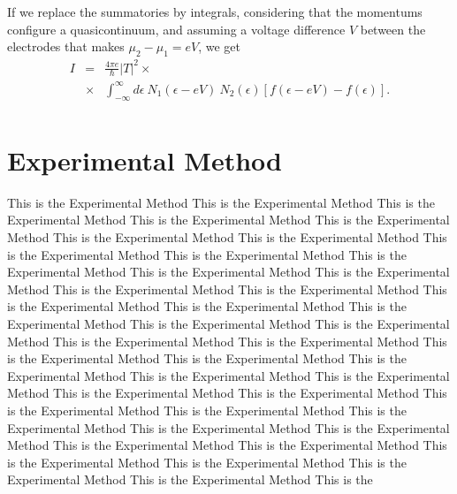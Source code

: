 \documentclass[twocolumn, twoside,a4paper,10pt]{article}
\begin{document}
If we replace the summatories by integrals, considering that the momentums configure a quasicontinuum, and assuming a voltage difference $V$ between the electrodes that makes $\mu_2-\mu_1=eV$, we get
\begin{eqnarray}\label{current3}
I &=& \frac{4\pi e}{\hbar}  |T|^2 \times
	\nonumber \\
	&\times& \int_{-\infty}^{\infty} d\epsilon\ N_1(\epsilon-eV)\ N_2(\epsilon) [f(\epsilon-eV)-f(\epsilon)].
	\nonumber \\
\end{eqnarray}




\section{Experimental Method}
This is the Experimental Method This is the Experimental Method This is the Experimental Method This is the Experimental Method This is the Experimental Method This is the Experimental Method This is the Experimental Method This is the Experimental Method This is the Experimental Method This is the Experimental Method This is the Experimental Method This is the Experimental Method This is the Experimental Method This is the Experimental Method This is the Experimental Method This is the Experimental Method This is the Experimental Method This is the Experimental Method This is the Experimental Method This is the Experimental Method This is the Experimental Method This is the Experimental Method This is the Experimental Method This is the Experimental Method This is the Experimental Method This is the Experimental Method This is the Experimental Method This is the Experimental Method This is the Experimental Method This is the Experimental Method This is the Experimental Method This is the Experimental Method This is the Experimental Method This is the Experimental Method This is the Experimental Method This is the Experimental Method This is the Experimental Method This is the Experimental Method This is the Experimental Method This is the 
\end{document}

